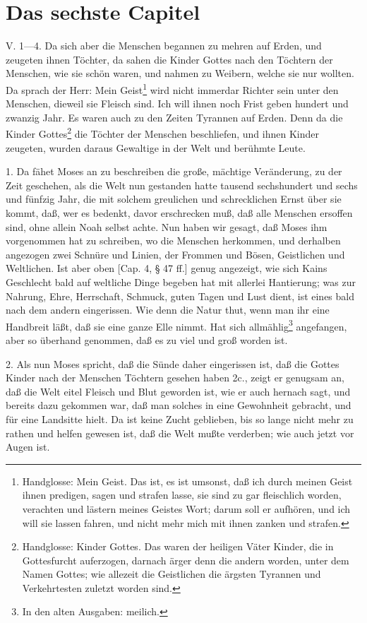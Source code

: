 \section{Das sechste Capitel}

V. 1—4. Da sich aber die Menschen begannen zu mehren auf Erden, und zeugeten ihnen Töchter, da sahen die Kinder Gottes nach den Töchtern der Menschen, wie sie schön waren, und nahmen zu Weibern, welche sie nur wollten. Da sprach der Herr: Mein Geist\footnote{Handglosse: Mein Geist. Das ist, es ist umsonst, daß ich durch meinen Geist ihnen predigen, sagen und strafen lasse, sie sind zu gar fleischlich worden, verachten und lästern meines Geistes Wort; darum soll er aufhören, und ich will sie lassen fahren, und nicht mehr mich mit ihnen zanken und strafen.} wird nicht immerdar Richter sein unter den Menschen, dieweil sie Fleisch sind. Ich will ihnen noch Frist geben hundert und zwanzig Jahr. Es waren auch zu den Zeiten Tyrannen auf Erden. Denn da die Kinder Gottes\footnote{Handglosse: Kinder Gottes. Das waren der heiligen Väter Kinder, die in Gottesfurcht auferzogen, darnach ärger denn die andern worden, unter dem Namen Gottes; wie allezeit die Geistlichen die ärgsten Tyrannen und Verkehrtesten zuletzt worden sind.} die Töchter der Menschen beschliefen, und ihnen Kinder zeugeten, wurden daraus Gewaltige in der Welt und berühmte Leute.

1. Da fähet Moses an zu beschreiben die große, mächtige Veränderung, zu der Zeit geschehen, als die Welt nun gestanden hatte tausend sechshundert und sechs und fünfzig Jahr, die mit solchem greulichen und schrecklichen Ernst über sie kommt, daß, wer es bedenkt, davor erschrecken muß, daß alle Menschen ersoffen sind, ohne allein Noah selbst achte. Nun haben wir gesagt, daß Moses ihm vorgenommen hat zu schreiben, wo die Menschen herkommen, und derhalben angezogen zwei Schnüre und Linien, der Frommen und Bösen, Geistlichen und Weltlichen. Ist aber oben [Cap. 4, § 47 ff.] genug angezeigt, wie sich Kains Geschlecht bald auf weltliche Dinge begeben hat mit allerlei Hantierung; was zur Nahrung, Ehre, Herrschaft, Schmuck, guten Tagen und Lust dient, ist eines bald nach dem andern eingerissen. Wie denn die Natur thut, wenn man ihr eine Handbreit läßt, daß sie eine ganze Elle nimmt. Hat sich allmählig\footnote{In den alten Ausgaben: meilich.} angefangen, aber so überhand genommen, daß es zu viel und groß worden ist.

2. Als nun Moses spricht, daß die Sünde daher eingerissen ist, daß die Gottes Kinder nach der Menschen Töchtern gesehen haben 2c., zeigt er genugsam an, daß die Welt eitel Fleisch und Blut geworden ist, wie er auch hernach sagt, und bereits dazu gekommen war, daß man solches in eine Gewohnheit gebracht, und für eine Landsitte hielt. Da ist keine Zucht geblieben, bis so lange nicht mehr zu rathen und helfen gewesen ist, daß die Welt mußte verderben; wie auch jetzt vor Augen ist.

